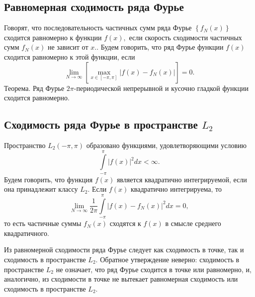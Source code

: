 \subsection{Равномерная сходимость ряда Фурье}

Говорят, что последовательность частичных сумм ряда Фурье \(\left\{ {{f_N}\left( x \right)} \right\}\) сходится равномерно к функции \(f\left( x \right),\) если скорость сходимости частичных сумм \({{f_N}\left( x \right)}\) не зависит от \(x.\). Будем говорить, что ряд Фурье функции \(f\left( x \right)\) сходится равномерно к этой функции, если \[\lim\limits_{N \to \infty } \left[ {\max\limits_{x \in \left[ { - \pi ,\pi } \right]} \left| {f\left( x \right) - {f_N}\left( x \right)} \right|} \right] = 0.\] Теорема. Ряд Фурье \(2\pi\)-периодической непрерывной и кусочно гладкой функции сходится равномерно.

\subsection{Сходимость ряда Фурье в пространстве \({L_2}\)}
Пространство \({L_2}\left( { - \pi ,\pi } \right)\) образовано функциями, удовлетворяющими условию \[\int\limits_{ - \pi }^\pi {{{\left| {f\left( x \right)} \right|}^2}dx} < \infty .\] Будем говорить, что функция \(f\left( x \right)\) является квадратично интегрируемой, если она принадлежит классу \({L_2}.\) Если \(f\left( x \right)\) квадратично интегрируема, то \[\lim\limits_{N \to \infty } \frac{1}{{2\pi }}\int\limits_{ - \pi }^\pi {{{\left| {f\left( x \right) - {f_N}\left( x \right)} \right|}^2}dx} = 0,\] то есть частичные суммы \({f_N}\left( x \right)\) сходятся к \(f\left( x \right)\) в смысле среднего квадратичного.

Из равномерной сходимости ряда Фурье следует как сходимость в точке, так и сходимость в пространстве \({L_2}.\) Обратное утверждение неверно: сходимость в пространстве \({L_2}\) не означает, что ряд Фурье сходится в точке или равномерно, и, аналогично, из сходимости в точке не вытекает равномерная сходимость или сходимость в пространстве \({L_2}.\)

